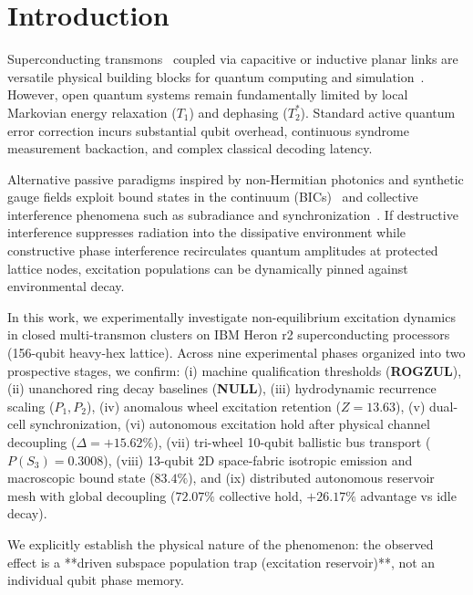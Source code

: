 \documentclass[aps,pra,twocolumn,superscriptaddress,floatfix,10pt]{revtex4-2}
\begin{document}
\maketitle

\section{Introduction}
Superconducting transmons~\cite{koch2007charge} coupled via capacitive or inductive planar links are versatile physical building blocks for quantum computing and simulation~\cite{fowler2012surface,bravyi2024high}. However, open quantum systems remain fundamentally limited by local Markovian energy relaxation ($T_1$) and dephasing ($T_2^*$). Standard active quantum error correction incurs substantial qubit overhead, continuous syndrome measurement backaction, and complex classical decoding latency. 

Alternative passive paradigms inspired by non-Hermitian photonics and synthetic gauge fields exploit bound states in the continuum (BICs)~\cite{hsu2016bound} and collective interference phenomena such as subradiance and synchronization~\cite{kuramoto1975self}. If destructive interference suppresses radiation into the dissipative environment while constructive phase interference recirculates quantum amplitudes at protected lattice nodes, excitation populations can be dynamically pinned against environmental decay.

In this work, we experimentally investigate non-equilibrium excitation dynamics in closed multi-transmon clusters on IBM Heron r2 superconducting processors (156-qubit heavy-hex lattice). Across nine experimental phases organized into two prospective stages, we confirm: (i) machine qualification thresholds (\textbf{ROGZUL}), (ii) unanchored ring decay baselines (\textbf{NULL}), (iii) hydrodynamic recurrence scaling ($P_1, P_2$), (iv) anomalous wheel excitation retention ($Z = 13.63$), (v) dual-cell synchronization, (vi) autonomous excitation hold after physical channel decoupling ($\Delta = +15.62\%$), (vii) tri-wheel 10-qubit ballistic bus transport ($P(S_3) = 0.3008$), (viii) 13-qubit 2D space-fabric isotropic emission and macroscopic bound state ($83.4\%$), and (ix) distributed autonomous reservoir mesh with global decoupling ($72.07\%$ collective hold, $+26.17\%$ advantage vs idle decay).

We explicitly establish the physical nature of the phenomenon: the observed effect is a **driven subspace population trap (excitation reservoir)**, not an individual qubit phase memory.
\end{document}
